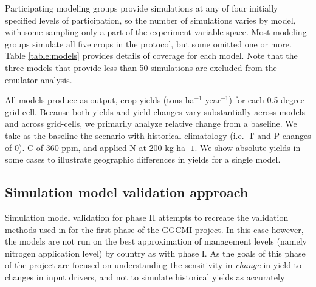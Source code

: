 \documentclass[preprint, 5p, times, twocolumn]{elsarticle}
\begin{document}
Participating modeling groups provide simulations at any of four initially specified levels of participation, so the number of simulations varies by model, with some sampling only a part of the experiment variable space. Most modeling groups simulate all five crops in the protocol, but some omitted one or more. Table \ref{table:models} provides details of coverage for each model. Note that the three models that provide less than 50 simulations are excluded from the emulator analysis. 

All models produce as output, crop yields (tons ha$^{-1}$ year$^{-1}$) for each 0.5 degree grid cell. Because both yields and yield changes vary substantially across models and across grid-cells, we primarily analyze relative change from a baseline. We take as the baseline the scenario with historical climatology (i.e.\ T and P changes of 0). C of 360 ppm, and applied N at 200 kg ha$^-1$.  We show absolute yields in some cases to illustrate geographic differences in yields for a single model. 

\subsection{Simulation model validation approach}
Simulation model validation for phase II attempts to recreate the validation methods used in \citet{muller_global_2017} for the first phase of the GGCMI project. In this case however, the models are not run on the best approximation of management levels (namely nitrogen application level) by country as with phase I. As the goals of this phase of the project are focused on understanding the sensitivity in \textit{change} in yield to changes in input drivers, and not to simulate historical yields as accurately 
\end{document}
